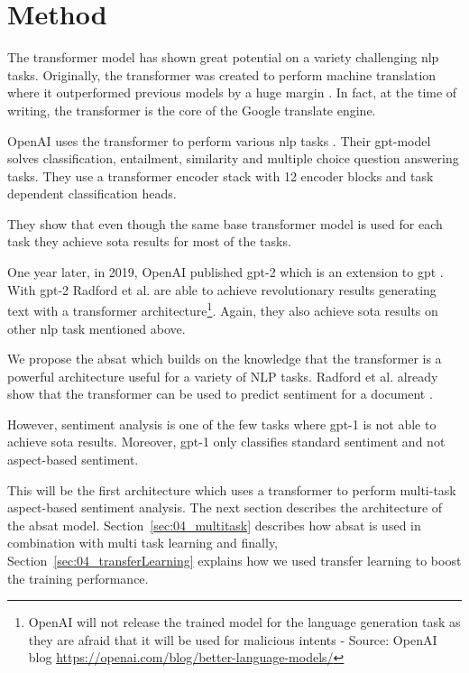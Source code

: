 \chapter{Method}
\label{ch:method}

The transformer model has shown great potential on a variety challenging \gls{nlp} tasks. Originally, the transformer was created to perform machine translation where it outperformed previous models by a huge margin \cite{Vaswani2017}. In fact, at the time of writing, the transformer is the core of the Google translate engine.
\medskip

OpenAI uses the transformer to perform various \gls{nlp} tasks \cite{Radford2018}. Their \gls{gpt}-model solves classification, entailment, similarity and multiple choice question answering tasks. They use a transformer encoder stack with 12 encoder blocks and task dependent classification heads. 

They show that even though the same base transformer model is used for each task they achieve \gls{sota} results for most of the tasks.
\medskip

One year later, in 2019, OpenAI published \gls{gpt}-2 which is an extension to \gls{gpt} \cite{Radford2019}. With \gls{gpt}-2 Radford et al. are able to achieve revolutionary results generating text with a transformer architecture\footnote{OpenAI will not release the trained model for the language generation task as they are afraid that it will be used for malicious intents - Source: OpenAI blog \url{https://openai.com/blog/better-language-models/}}. Again, they also achieve \gls{sota} results on other \gls{nlp} task mentioned above.
\bigskip

We propose the \acrfull{absat} which builds on the knowledge that the transformer is a powerful architecture useful for a variety of NLP tasks. Radford et al. already show that the transformer can be used to predict sentiment for a document \cite{Radford2018}. 

However, sentiment analysis is one of the few tasks where \gls{gpt}-1 is not able to achieve \gls{sota} results. Moreover, \gls{gpt}-1 only classifies standard sentiment and not aspect-based sentiment.
\medskip

This will be the first architecture which uses a transformer to perform multi-task aspect-based sentiment analysis. The next section describes the architecture of the \gls{absat} model. Section~\ref{sec:04_multitask} describes how \gls{absat} is used in combination with multi task learning and finally, Section~\ref{sec:04_transferLearning} explains how we used transfer learning to boost the training performance.

